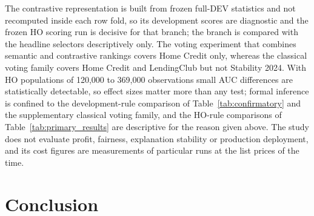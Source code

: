 \documentclass[final,5p,twocolumn]{elsarticle}
\begin{document}
The contrastive representation is built from frozen full-DEV statistics and not recomputed inside each row fold, so its development scores are diagnostic and the frozen HO scoring run is decisive for that branch; the branch is compared with the headline selectors descriptively only. The voting experiment that combines semantic and contrastive rankings covers Home Credit only, whereas the classical voting family covers Home Credit and LendingClub but not Stability 2024. With HO populations of 120,000 to 369,000 observations small AUC differences are statistically detectable, so effect sizes matter more than any test; formal inference is confined to the development-rule comparison of Table~\ref{tab:confirmatory} and the supplementary classical voting family, and the HO-rule comparisons of Table~\ref{tab:primary_results} are descriptive for the reason given above. The study does not evaluate profit, fairness, explanation stability or production deployment, and its cost figures are measurements of particular runs at the list prices of the time.


\section{Conclusion}
\label{sec:conclusion}
\end{document}
